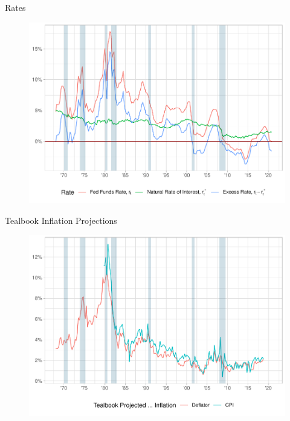 \documentclass[10pt,aspectratio=169]{beamer}
\begin{document}
    \begin{frame}{Rates}
        \begin{figure}[h!]\centering 
            \begin{minipage}{0.7\textwidth}\centering
                \includegraphics[width=\textwidth]{rate_plot.pdf}
            \end{minipage}
        \end{figure}
    \end{frame}

    \begin{frame}{Tealbook Inflation Projections}
        \begin{figure}[!h]\centering
            \begin{minipage}{0.7\textwidth}\centering
                \includegraphics[width=\textwidth]{expected_inflation_plot.pdf}
            \end{minipage}
        \end{figure}
    \end{frame}
\end{document}
